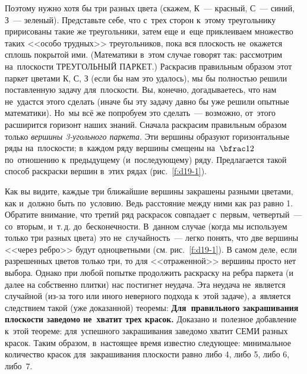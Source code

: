 Поэтому нужно хотя бы три разных цвета (скажем, К~--- красный, С~--- синий, З~--- зеленый). Представьте себе,
что с~трех сторон к~этому треугольнику пририсованы такие же треугольники, затем еще и~еще
приклеиваем множество таких <<особо трудных>> треугольников, пока вся плоскость не~окажется сплошь
покрытой ими. (Математики в~этом случае говорят так: рассмотрим на~плоскости ТРЕУГОЛЬНЫЙ ПАРКЕТ.)
Раскрасив правильным образом этот паркет цветами К, С, З (если бы нам это удалось), мы бы полностью
решили поставленную задачу для~плоскости. Вы, конечно, догадываетесь, что нам не~удастся этого
сделать (иначе бы эту задачу давно бы уже решили опытные математики). Но~мы всё же попробуем это
сделать~--- возможно, от~этого расширится горизонт наших знаний. Сначала раскрасим правильным
образом только \textit{вершины 3-угольного паркета}. Эти вершины образуют горизонтальные ряды на~плоскости;
в~каждом ряду вершины смещены на~$\bfrac12$ по~отношению к~предыдущему (и~последующему) ряду. Предлагается
такой способ раскраски вершин в~этих рядах (рис.~\ref{f:d19-1}).



Как вы видите, каждые три ближайшие вершины закрашены разными цветами, как и~должно быть
по~условию. Ведь расстояние между ними как раз равно 1. Обратите внимание, что третий ряд раскрасок
совпадает с~первым, четвертый~--- со~вторым, и~т.\,д. до~бесконечности. В~данном случае (когда мы
используем только три разных цвета) это не~случайность~--- легко понять, что две вершины <<через
ребро>> будут одноцветными (см. рис.~\ref{f:d19-1}). В самом деле, если разрешенных цветов
только три, то для <<отраженной>> вершины просто нет выбора. Однако при любой попытке продолжить
раскраску на ребра паркета (и далее на собственно плитки) нас постигнет неудача. Эта неудача
не~является случайной (из-за того или иного неверного подхода к~этой задаче), а~является следствием
такой (уже доказанной) теоремы: \textbf{Для~правильного закрашивания плоскости заведомо не~хватит
трех красок.}
 Доказано и~полезное
добавление к~этой теореме: для~успешного закрашивания заведомо хватит СЕМИ разных красок. Таким
образом, в~настоящее время известно следующее: минимальное количество красок для~закрашивания
плоскости равно либо 4, либо 5, либо 6, либо~7.

